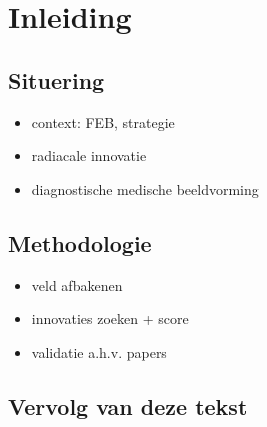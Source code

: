 \chapter{Inleiding}
\section{Situering}
\begin{itemize}
  \item context: FEB, strategie
  \item radiacale innovatie
  \item diagnostische medische beeldvorming
\end{itemize}


\section{Methodologie}
\begin{itemize}
  \item veld afbakenen
  \item innovaties zoeken + score
  \item validatie a.h.v. papers
\end{itemize}

\section{Vervolg van deze tekst}
